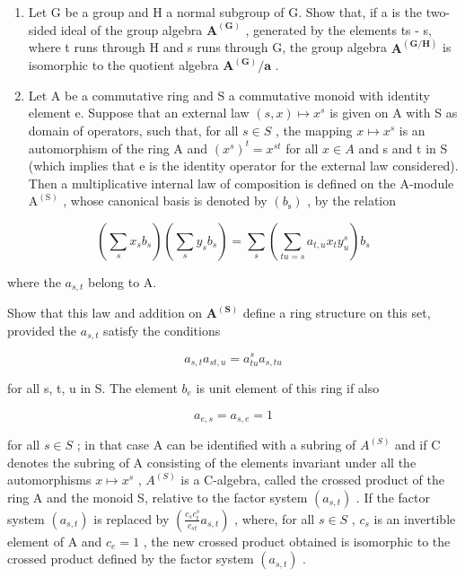 \begin{enumerate}
\def\labelenumi{\arabic{enumi}.}
\setcounter{enumi}{9}
\item
  Let G be a group and H a normal subgroup of G. Show that, if a is the two-sided ideal of the group algebra \(\mathbf{A}^{(\mathbf{G})}\) , generated by the elements ts - s, where t runs through H and s runs through G, the group algebra \(\mathbf{A}^{(\mathbf{G}/\mathbf{H})}\) is isomorphic to the quotient algebra \(\mathbf{A}^{(\mathbf{G})}/\mathbf{a}\) .
\item
  Let A be a commutative ring and S a commutative monoid with identity element e. Suppose that an external law \((s, x) \mapsto x^{s}\) is given on A with S as domain of operators, such that, for all \(s \in S\) , the mapping \(x \mapsto x^{s}\) is an automorphism of the ring A and \((x^{s})^{t} = x^{st}\) for all \(x \in A\) and s and t in S (which implies that e is the identity operator for the external law considered). Then a multiplicative internal law of composition is defined on the A-module \(\mathrm{A}^{(\mathrm{S})}\) , whose canonical basis is denoted by \((b_{\mathrm{s}})\) , by the relation
\end{enumerate}

\[
\left(\sum_ {s} x _ {s} b _ {s}\right) \left(\sum_ {s} y _ {s} b _ {s}\right) = \sum_ {s} \left(\sum_ {t u = s} a _ {t, u} x _ {t} y _ {u} ^ {s}\right) b _ {s}
\]

where the \(a_{s,t}\) belong to A.

Show that this law and addition on \(\mathbf{A}^{(\mathbf{S})}\) define a ring structure on this set, provided the \(a_{s,t}\) satisfy the conditions

\[
a _ {s, t} a _ {s t, u} = a _ {t u} ^ {s} a _ {s, t u}
\]

for all s, t, u in S. The element \(b_{e}\) is unit element of this ring if also

\[
a _ {e, s} = a _ {s, e} = 1
\]

for all \(s \in S\) ; in that case A can be identified with a subring of \(A^{(S)}\) and if C denotes the subring of A consisting of the elements invariant under all the automorphisms \(x \mapsto x^s\) , \(A^{(S)}\) is a C-algebra, called the crossed product of the ring A and the monoid S, relative to the factor system \((a_{s,t})\) . If the factor system \((a_{s,t})\) is replaced by \(\left(\frac{c_s c_t^s}{c_{st}} a_{s,t}\right)\) , where, for all \(s \in S\) , \(c_s\) is an invertible element of A and \(c_e = 1\) , the new crossed product obtained is isomorphic to the crossed product defined by the factor system \((a_{s,t})\) .

